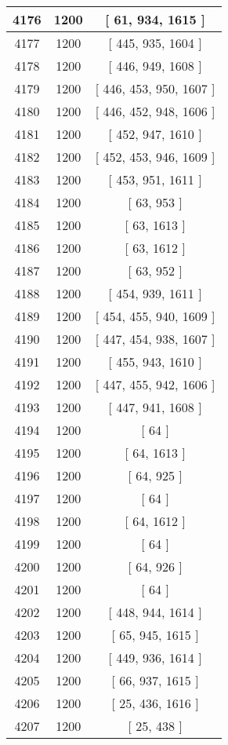 \begin{center}
\begin{longtable}[H]{|| c c c ||}
4176 & 1200 & [ 61, 934, 1615 ] \\ 
\hline
4177 & 1200 & [ 445, 935, 1604 ] \\ 
\hline
4178 & 1200 & [ 446, 949, 1608 ] \\ 
\hline
4179 & 1200 & [ 446, 453, 950, 1607 ] \\ 
\hline
4180 & 1200 & [ 446, 452, 948, 1606 ] \\ 
\hline
4181 & 1200 & [ 452, 947, 1610 ] \\ 
\hline
4182 & 1200 & [ 452, 453, 946, 1609 ] \\ 
\hline
4183 & 1200 & [ 453, 951, 1611 ] \\ 
\hline
4184 & 1200 & [ 63, 953 ] \\ 
\hline
4185 & 1200 & [ 63, 1613 ] \\ 
\hline
4186 & 1200 & [ 63, 1612 ] \\ 
\hline
4187 & 1200 & [ 63, 952 ] \\ 
\hline
4188 & 1200 & [ 454, 939, 1611 ] \\ 
\hline
4189 & 1200 & [ 454, 455, 940, 1609 ] \\ 
\hline
4190 & 1200 & [ 447, 454, 938, 1607 ] \\ 
\hline
4191 & 1200 & [ 455, 943, 1610 ] \\ 
\hline
4192 & 1200 & [ 447, 455, 942, 1606 ] \\ 
\hline
4193 & 1200 & [ 447, 941, 1608 ] \\ 
\hline
4194 & 1200 & [ 64 ] \\ 
\hline
4195 & 1200 & [ 64, 1613 ] \\ 
\hline
4196 & 1200 & [ 64, 925 ] \\ 
\hline
4197 & 1200 & [ 64 ] \\ 
\hline
4198 & 1200 & [ 64, 1612 ] \\ 
\hline
4199 & 1200 & [ 64 ] \\ 
\hline
4200 & 1200 & [ 64, 926 ] \\ 
\hline
4201 & 1200 & [ 64 ] \\ 
\hline
4202 & 1200 & [ 448, 944, 1614 ] \\ 
\hline
4203 & 1200 & [ 65, 945, 1615 ] \\ 
\hline
4204 & 1200 & [ 449, 936, 1614 ] \\ 
\hline
4205 & 1200 & [ 66, 937, 1615 ] \\ 
\hline
4206 & 1200 & [ 25, 436, 1616 ] \\ 
\hline
4207 & 1200 & [ 25, 438 ] \\ 

\end{longtable}
\end{center}
